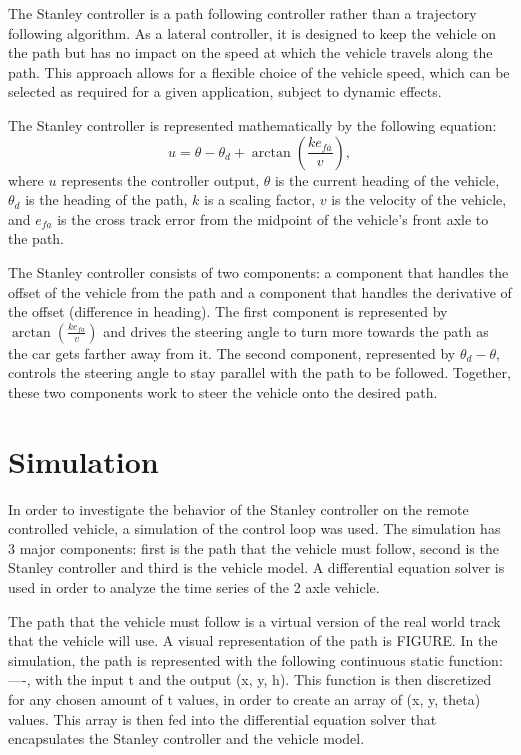 \documentclass[arbeit=studie,oneside,BCOR=12mm]{ArbeitRST}
\begin{document}
The Stanley controller is a path following controller rather than a trajectory
following algorithm. As a lateral controller, it is designed to keep the
vehicle on the path but has no impact on the speed at which the vehicle travels
along the path. This approach allows for a flexible choice of the vehicle
speed, which can be selected as required for a given application, subject to
dynamic effects.

The Stanley controller is represented mathematically by the following equation:
\begin{equation}
    u = \theta - \theta_d + \arctan\left(\frac{ke_{fa}}{v}\right),
    \label{eq:Stanley-Regler}
\end{equation}
where $u$ represents the controller output, $\theta$ is the current heading of
the vehicle, $\theta_d$ is the heading of the path, $k$ is a scaling factor,
$v$ is the velocity of the vehicle, and $e_{fa}$ is the cross track error from
the midpoint of the vehicle's front axle to the path.

The Stanley controller consists of two components: a component that handles the
offset of the vehicle from the path and a component that handles the derivative
of the offset (difference in heading). The first component is represented by
$\arctan(\frac{ke_{fa}}{v})$ and drives the steering angle to turn more towards
the path as the car gets farther away from it. The second component,
represented by $\theta_d - \theta$, controls the steering angle to stay
parallel with the path to be followed. Together, these two components work to
steer the vehicle onto the desired path.


\section{Simulation}
In order to investigate the behavior of the Stanley controller on the remote
controlled vehicle, a simulation of the control loop was used. The simulation
has 3 major components: first is the path that the vehicle must follow, second
is the Stanley controller and third is the vehicle model. A differential
equation solver is used in order to analyze the time series of the 2 axle
vehicle. 

The path that the vehicle must follow is a virtual version of the real world
track that the vehicle will use. A visual representation of the path is FIGURE.
In the simulation, the path is represented with the following continuous static
function: ----, with the input t and the output (x, y, h). This function is
then discretized for any chosen amount of t values, in order to create an array
of (x, y, theta) values. This array is then fed into the differential equation
solver that encapsulates the Stanley controller and the vehicle model. 
\end{document}
